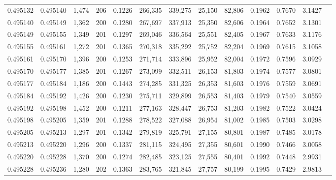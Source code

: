 \begin{tabular}{rrrrrrrrrrrrr}
0.495132 & 0.495140 & 1,474 & 206 &                                     0.1226 & 266,335 & 339,275 &  25,150 &  82,806 & 0.1962 & 0.7670 & 3.1427 \\
0.495140 & 0.495149 & 1,362 & 200 &                                     0.1280 & 267,697 & 337,913 &  25,350 &  82,606 & 0.1964 & 0.7652 & 3.1301 \\
0.495149 & 0.495155 & 1,349 & 201 &                                     0.1297 & 269,046 & 336,564 &  25,551 &  82,405 & 0.1967 & 0.7633 & 3.1176 \\
0.495155 & 0.495161 & 1,272 & 201 &                                     0.1365 & 270,318 & 335,292 &  25,752 &  82,204 & 0.1969 & 0.7615 & 3.1058 \\
0.495161 & 0.495170 & 1,396 & 200 &                                     0.1253 & 271,714 & 333,896 &  25,952 &  82,004 & 0.1972 & 0.7596 & 3.0929 \\
0.495170 & 0.495177 & 1,385 & 201 &                                     0.1267 & 273,099 & 332,511 &  26,153 &  81,803 & 0.1974 & 0.7577 & 3.0801 \\
0.495177 & 0.495184 & 1,186 & 200 &                                     0.1443 & 274,285 & 331,325 &  26,353 &  81,603 & 0.1976 & 0.7559 & 3.0691 \\
0.495184 & 0.495192 & 1,426 & 200 &                                     0.1230 & 275,711 & 329,899 &  26,553 &  81,403 & 0.1979 & 0.7540 & 3.0559 \\
0.495192 & 0.495198 & 1,452 & 200 &                                     0.1211 & 277,163 & 328,447 &  26,753 &  81,203 & 0.1982 & 0.7522 & 3.0424 \\
0.495198 & 0.495205 & 1,359 & 201 &                                     0.1288 & 278,522 & 327,088 &  26,954 &  81,002 & 0.1985 & 0.7503 & 3.0298 \\
0.495205 & 0.495213 & 1,297 & 201 &                                     0.1342 & 279,819 & 325,791 &  27,155 &  80,801 & 0.1987 & 0.7485 & 3.0178 \\
0.495213 & 0.495220 & 1,296 & 200 &                                     0.1337 & 281,115 & 324,495 &  27,355 &  80,601 & 0.1990 & 0.7466 & 3.0058 \\
0.495220 & 0.495228 & 1,370 & 200 &                                     0.1274 & 282,485 & 323,125 &  27,555 &  80,401 & 0.1992 & 0.7448 & 2.9931 \\
0.495228 & 0.495236 & 1,280 & 202 &                                     0.1363 & 283,765 & 321,845 &  27,757 &  80,199 & 0.1995 & 0.7429 & 2.9813 \\

\end{tabular}
